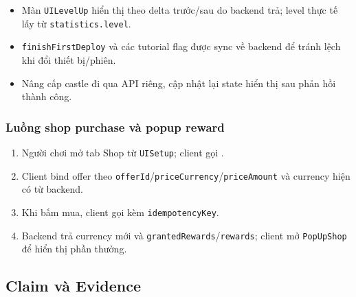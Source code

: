 \begin{itemize}
    \item Màn \texttt{UILevelUp} hiển thị theo delta trước/\allowbreak sau do backend trả; level thực tế lấy từ \texttt{statistics.level}.
    \item \texttt{finishFirstDeploy} và các tutorial flag được sync về backend để tránh lệch khi đổi thiết bị/\allowbreak phiên.
    \item Nâng cấp castle đi qua API riêng, cập nhật lại state hiển thị sau phản hồi thành công.
\end{itemize}

\subsubsection{Luồng shop purchase và popup reward}
\label{subsubsec:impl-flow-shop}

\begin{enumerate}
    \item Người chơi mở tab Shop từ \texttt{UISetup}; client gọi .
    \item Client bind offer theo \texttt{offerId}/\texttt{priceCurrency}/\texttt{priceAmount} và currency hiện có từ backend.
    \item Khi bấm mua, client gọi  kèm \texttt{idempotencyKey}.
    \item Backend trả currency mới và \texttt{grantedRewards}/\texttt{rewards}; client mở \texttt{PopUpShop} để hiển thị phần thưởng.
\end{enumerate}

\subsection{Claim và Evidence}
\label{subsec:impl-traceability}

